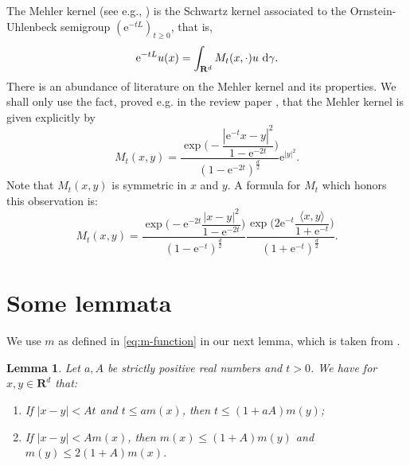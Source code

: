 \documentclass{amsart}
\newtheorem{lemma}{Lemma}
\theoremstyle{remark}
\newcommand{\D}{\,\textup{d}}
\newcommand{\la}{\langle}
\newcommand{\ra}{\rangle}
\renewcommand{\leq}{\leqslant}
\renewcommand{\leq}{\leqslant}
\renewcommand{\geq}{\geqslant}
\newcommand{\R}{\mathbf R}
\newcommand{\e}{\mathrm{e}} %
\renewcommand{\leq}{\leqslant}%
\renewcommand{\geq}{\geqslant}%
\begin{document}
The Mehler kernel (see e.g., \cite{Sjogren1997}) is the
Schwartz kernel associated to the Ornstein-Uhlenbeck semigroup
$(\e^{-tL})_{t \geq 0}$, that is,
\begin{equation}
  \label{eq:Ornstein-Uhlenbeck-semigroup-integral}
  \e^{-tL} u(x) = \int_{\R^d} M_t(x, \cdot) u \, \D\gamma.
\end{equation}
There is an abundance of literature on the Mehler kernel and its
properties. We shall only use the fact, proved e.g. in the review paper
\cite{Sjogren1997}, that the Mehler kernel is given explicitly
by
\begin{equation*}
  M_t(x,y) = \frac{\exp\biggl(-\dfrac{|\e^{-t} x - y|^2}{1 - \e^{-2t}}
    \biggr)}{(1 - \e^{-2t})^{\frac{d}2}} \e^{|y|^2}.
\end{equation*}
Note that $M_t(x,y)$ is symmetric in $x$ and $y$. A formula for $M_t$ which
honors this observation is: 
\begin{equation}
  \label{eq:Mehler-kernel}
  M_t(x, y) = \frac{\exp\biggl(-\e^{-2t} \dfrac{|x - y|^2}{1
      - \e^{-2 t}}  \biggr)}{(1 - \e^{-t})^{\frac{d}2}}
  \frac{\exp\biggl(2\e^{-t} \dfrac{\la x, y \ra}{1 + \e^{-t}}
    \biggr)}{(1 + \e^{-t})^{\frac{d}2}}.
\end{equation}

\section{Some lemmata}
We use $m$ as defined in \eqref{eq:m-function} in our next lemma,
which is taken from \cite{MaasNeervenPortal2011}.
\begin{lemma}\label{lem:m-xy-equivalence}
  Let $a, A$ be strictly positive real numbers and $t > 0$. We have
  for $x, y \in \R^d$ that:
  \begin{enumerate}
  \item If $|x - y| < A t$ and $t \leq a m(x)$, then $t
    \leq (1 + aA) m(y)$;
  \item If $|x - y| < A m(x)$, then $m(x) \leq (1 +
    A) m(y)$ and $m(y) \leq 2 (1 + A) m(x)$. 
  \end{enumerate}
\end{lemma}
\end{document}
